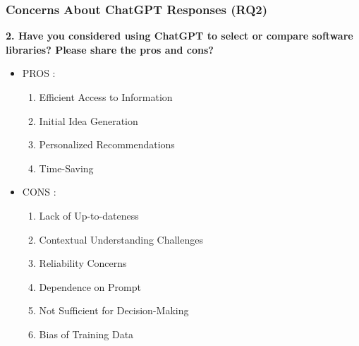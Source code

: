 \begin{frame}
    \frametitle{Concerns About ChatGPT Responses (RQ2)}
    \vspace{1em}
    \textbf{2. Have you considered using ChatGPT to select or compare
    software libraries? Please share the pros and cons?}
    \vspace{0.5em}
    \begin{itemize}
        \item PROS :
        \begin{enumerate}
            \item Efficient Access to Information
            \item Initial Idea Generation
            \item Personalized Recommendations
            \item Time-Saving
        \end{enumerate}
        \vspace{0.5em}
        \item CONS :
        \begin{enumerate}
            \item Lack of Up-to-dateness
            \item Contextual Understanding Challenges
            \item Reliability Concerns
            \item Dependence on Prompt
            \item Not Sufficient for Decision-Making
            \item Bias of Training Data
        \end{enumerate}
        
    \end{itemize}
    
\end{frame}


